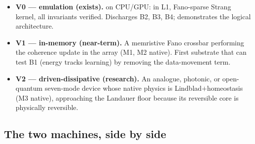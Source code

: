 \begin{itemize}[leftmargin=1.5em,itemsep=1pt]
  \item \textbf{V0 --- emulation (exists).} \SYNARC{} on CPU/GPU: \DM{} in
        L1, Fano-sparse Strang kernel, all invariants verified. Discharges
        B2, B3, B4; demonstrates the logical architecture.
  \item \textbf{V1 --- in-memory (near-term).} A memristive Fano crossbar
        performing the coherence update in the array (M1, M2 native). First
        substrate that can test B1 (energy tracks learning) by removing the
        data-movement term.
  \item \textbf{V2 --- driven-dissipative (research).} An analogue, photonic,
        or open-quantum seven-mode device whose native physics is
        Lindblad$+$homeostasis (M3 native), approaching the Landauer floor
        because its reversible core is physically reversible.
\end{itemize}

\subsection{The two machines, side by side}

